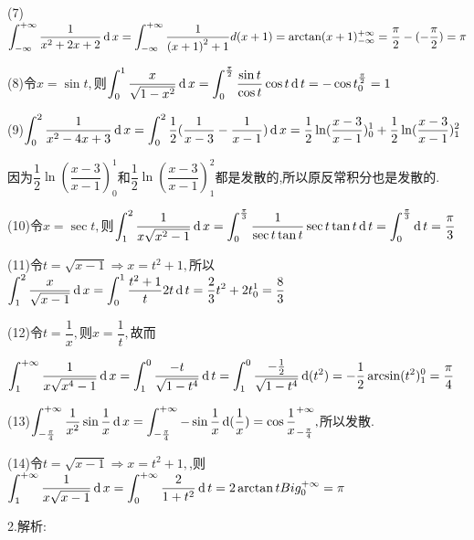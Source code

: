 (7)$\displaystyle\int_{ - \infty }^{ + \infty } {\dfrac{1}{{{x^2} + 2x + 2}}\operatorname{\mathop{}\!\mathrm{d}} x}  = \displaystyle\int_{ - \infty }^{ + \infty } {\dfrac{1}{{{{(x + 1)}^2} + 1}}d(x + 1) = \arctan (x + 1)_{ - \infty }^{ + \infty }}  = \dfrac{\pi }{2} - ( - \dfrac{\pi }{2}) = \pi $

(8)令$x = \sin t,$则$\displaystyle\int_0^1 {\dfrac{x}{{\sqrt {1 - {x^2}} }}} \operatorname{\mathop{}\!\mathrm{d}} x = \displaystyle\int_0^{\frac{\pi }{2}} {\dfrac{{\sin t}}{{\cos t}}\cos t\operatorname{\mathop{}\!\mathrm{d}} t =  - \cos t_0^{\frac{\pi }{2}}}  = 1$

(9)$\displaystyle\int_0^2 {\dfrac{1}{{{x^2} - 4x + 3}}\operatorname{\mathop{}\!\mathrm{d}} x}  = \displaystyle\int_0^2 {\dfrac{1}{2}} (\dfrac{1}{{x - 3}} - \dfrac{1}{{x - 1}})\operatorname{\mathop{}\!\mathrm{d}} x = \frac{1}{2}\ln (\dfrac{{x - 3}}{{x - 1}})_0^1 + \dfrac{1}{2}\ln (\dfrac{{x - 3}}{{x - 1}})_1^2$

因为$\dfrac{1}{2}\ln (\dfrac{{x - 3}}{{x - 1}})_0^1$和$\dfrac{1}{2}\ln (\dfrac{{x - 3}}{{x - 1}})_1^2$都是发散的,所以原反常积分也是发散的.

(10)令$x = \sec t,$则$\displaystyle\int_1^2 {\dfrac{1}{{x\sqrt {{x^2} - 1} }}\operatorname{\mathop{}\!\mathrm{d}} x}  = \displaystyle\int_0^{\frac{\pi }{3}} {\dfrac{1}{{\sec t\tan t}}\sec t\tan t\operatorname{\mathop{}\!\mathrm{d}} t = \displaystyle\int_0^{\frac{\pi }{3}} {\operatorname{\mathop{}\!\mathrm{d}} t}  = \dfrac{\pi }{3}} $

(11)令$t = \sqrt {x - 1}  \Rightarrow x = {t^2} + 1,$所以$\displaystyle\int_1^2 {\dfrac{x}{{\sqrt {x - 1} }}\operatorname{\mathop{}\!\mathrm{d}} x}  = \displaystyle\int_0^1 {\dfrac{{{t^2} + 1}}{t}} 2t\operatorname{\mathop{}\!\mathrm{d}} t = \dfrac{2}{3}{t^2} + 2t_0^1 = \dfrac{8}{3}$

(12)令$t = \dfrac{1}{x},$则$x = \dfrac{1}{t},$故而

$\displaystyle\int_1^{ + \infty } {\dfrac{1}{{x\sqrt {{x^4} - 1} }}\operatorname{\mathop{}\!\mathrm{d}} x}  = \displaystyle\int_1^0 {\dfrac{{ - t}}{{\sqrt {1 - {t^4}} }}} \operatorname{\mathop{}\!\mathrm{d}} t = \displaystyle\int_1^0 {\dfrac{{ - \frac{1}{2}}}{{\sqrt {1 - {t^4}} }}} \operatorname{\mathop{}\!\mathrm{d}} ({t^2}) =  - \dfrac{1}{2}\arcsin ({t^2})_1^0 = \dfrac{\pi }{4}$

(13)$\displaystyle\int_{ - \frac{\pi }{4}}^{ + \infty } {\dfrac{1}{{{x^2}}}} \sin \dfrac{1}{x}\operatorname{\mathop{}\!\mathrm{d}} x = \displaystyle\int_{ - \frac{\pi }{4}}^{ + \infty } { - \sin \dfrac{1}{x}} \operatorname{\mathop{}\!\mathrm{d}} (\dfrac{1}{x}) = \cos \dfrac{1}{x}_{ - \frac{\pi }{4}}^{ + \infty },$所以发散.

(14)令$t = \sqrt {x - 1}  \Rightarrow x = {t^2} + 1,$,则$\displaystyle\int_1^{ + \infty } {\dfrac{1}{{x\sqrt {x - 1} }}\operatorname{\mathop{}\!\mathrm{d}} x = \displaystyle\int_0^{ + \infty } {\frac{2}{{1 + {t^2}}}} } \operatorname{\mathop{}\!\mathrm{d}} t = 2\arctan t\\Big_0^{+\infty} = \pi $

2.解析:

